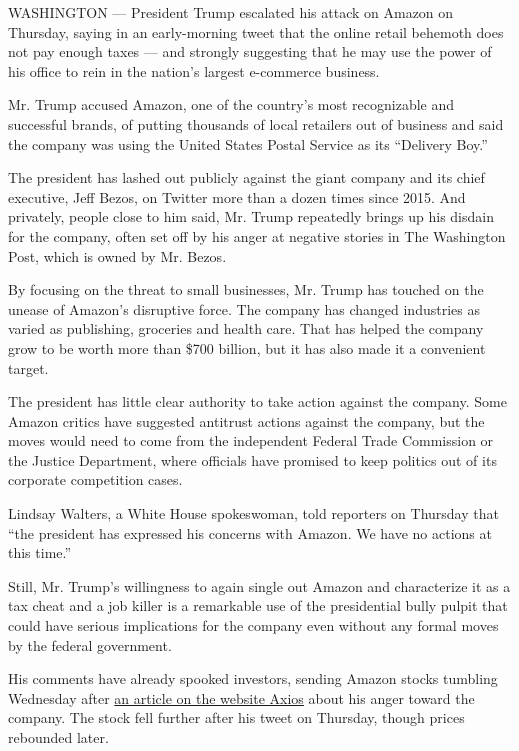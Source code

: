 WASHINGTON --- President Trump escalated his attack on Amazon on
Thursday, saying in an early-morning tweet that the online retail
behemoth does not pay enough taxes --- and strongly suggesting that he
may use the power of his office to rein in the nation's largest
e-commerce business.

Mr. Trump accused Amazon, one of the country's most recognizable and
successful brands, of putting thousands of local retailers out of
business and said the company was using the United States Postal Service
as its ``Delivery Boy.''

The president has lashed out publicly against the giant company and its
chief executive, Jeff Bezos, on Twitter more than a dozen times since
2015. And privately, people close to him said, Mr. Trump repeatedly
brings up his disdain for the company, often set off by his anger at
negative stories in The Washington Post, which is owned by Mr. Bezos.

By focusing on the threat to small businesses, Mr. Trump has touched on
the unease of Amazon's disruptive force. The company has changed
industries as varied as publishing, groceries and health care. That has
helped the company grow to be worth more than \$700 billion, but it has
also made it a convenient target.

The president has little clear authority to take action against the
company. Some Amazon critics have suggested antitrust actions against
the company, but the moves would need to come from the independent
Federal Trade Commission or the Justice Department, where officials have
promised to keep politics out of its corporate competition cases.

Lindsay Walters, a White House spokeswoman, told reporters on Thursday
that ``the president has expressed his concerns with Amazon. We have no
actions at this time.''

Still, Mr. Trump's willingness to again single out Amazon and
characterize it as a tax cheat and a job killer is a remarkable use of
the presidential bully pulpit that could have serious implications for
the company even without any formal moves by the federal government.

His comments have already spooked investors, sending Amazon stocks
tumbling Wednesday after
\href{https://www.axios.com/newsletters/axios-am-53f09706-9f2f-4dd9-b8dc-480285206e3f.html?chunk=0\#story0}{an
article on the website Axios} about his anger toward the company. The
stock fell further after his tweet on Thursday, though prices rebounded
later.

